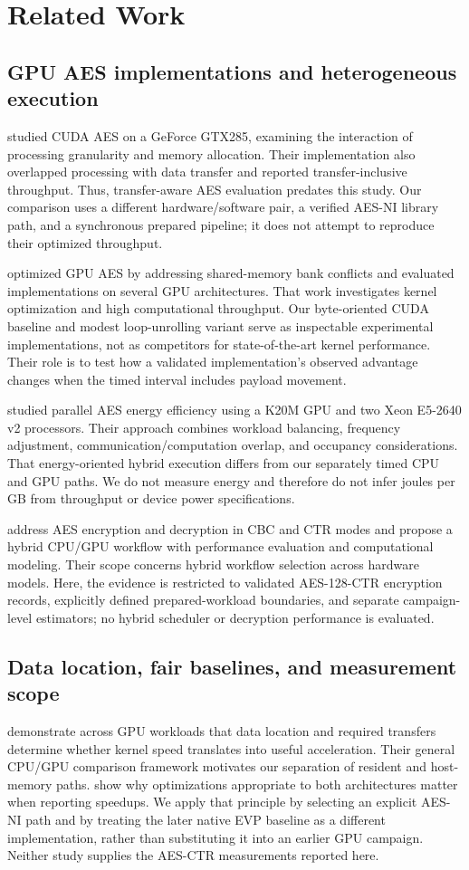 \documentclass[11pt,a4paper]{article}
\begin{document}
\section{Related Work}
\subsection{GPU AES implementations and heterogeneous execution}
\citet{iwai2012} studied CUDA AES on a GeForce GTX285, examining the interaction of processing granularity and memory allocation. Their implementation also overlapped processing with data transfer and reported transfer-inclusive throughput. Thus, transfer-aware AES evaluation predates this study. Our comparison uses a different hardware/software pair, a verified AES-NI library path, and a synchronous prepared pipeline; it does not attempt to reproduce their optimized throughput.

\citet{tezcan2021} optimized GPU AES by addressing shared-memory bank conflicts and evaluated implementations on several GPU architectures. That work investigates kernel optimization and high computational throughput. Our byte-oriented CUDA baseline and modest loop-unrolling variant serve as inspectable experimental implementations, not as competitors for state-of-the-art kernel performance. Their role is to test how a validated implementation's observed advantage changes when the timed interval includes payload movement.

\citet{fei2020} studied parallel AES energy efficiency using a K20M GPU and two Xeon E5-2640 v2 processors. Their approach combines workload balancing, frequency adjustment, communication/computation overlap, and occupancy considerations. That energy-oriented hybrid execution differs from our separately timed CPU and GPU paths. We do not measure energy and therefore do not infer joules per GB from throughput or device power specifications.

\citet{yang2025} address AES encryption and decryption in CBC and CTR modes and propose a hybrid CPU/GPU workflow with performance evaluation and computational modeling. Their scope concerns hybrid workflow selection across hardware models. Here, the evidence is restricted to validated AES-128-CTR encryption records, explicitly defined prepared-workload boundaries, and separate campaign-level estimators; no hybrid scheduler or decryption performance is evaluated.

\subsection{Data location, fair baselines, and measurement scope}
\citet{gregg2011} demonstrate across GPU workloads that data location and required transfers determine whether kernel speed translates into useful acceleration. Their general CPU/GPU comparison framework motivates our separation of resident and host-memory paths. \citet{lee2010} show why optimizations appropriate to both architectures matter when reporting speedups. We apply that principle by selecting an explicit AES-NI path and by treating the later native EVP baseline as a different implementation, rather than substituting it into an earlier GPU campaign. Neither study supplies the AES-CTR measurements reported here.
\end{document}
